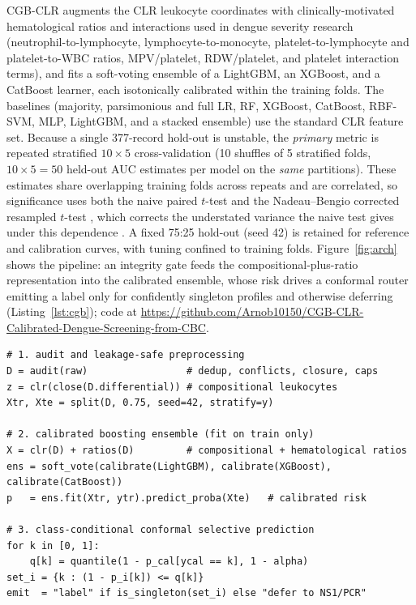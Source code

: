 \documentclass[conference]{IEEEtran}
\begin{document}
CGB-CLR augments the CLR leukocyte coordinates with clinically-motivated
hematological ratios and interactions used in dengue severity research
(neutrophil-to-lymphocyte, lymphocyte-to-monocyte, platelet-to-lymphocyte and
platelet-to-WBC ratios, MPV/platelet, RDW/platelet, and platelet interaction
terms), and fits a soft-voting ensemble of a LightGBM, an XGBoost, and a
CatBoost learner, each isotonically calibrated within the training folds. The
baselines (majority, parsimonious and full LR, RF, XGBoost, CatBoost, RBF-SVM,
MLP, LightGBM, and a stacked ensemble) use the standard CLR feature set.
Because a single 377-record hold-out is unstable, the \emph{primary} metric is
repeated stratified $10\times5$ cross-validation (10 shuffles of 5 stratified
folds, $10\times5=50$ held-out AUC estimates per model on the \emph{same}
partitions). These estimates share overlapping training folds across repeats
and are correlated, so significance uses both the naive paired $t$-test and
the Nadeau--Bengio corrected resampled $t$-test \cite{nadeau2003}, which
corrects the understated variance the naive test gives under this dependence
\cite{dietterich1998}. A fixed 75:25 hold-out (seed 42) is retained for
reference and calibration curves, with tuning confined to training folds.
Figure~\ref{fig:arch} shows the pipeline: an integrity gate feeds the
compositional-plus-ratio representation into the calibrated ensemble, whose
risk drives a conformal router emitting a label only for confidently singleton
profiles and otherwise deferring (Listing~\ref{lst:cgb}); code at
\url{https://github.com/Arnob10150/CGB-CLR-Calibrated-Dengue-Screening-from-CBC}.



\begin{lstlisting}[caption={CGB-CLR training and conformal inference.},label={lst:cgb}]
# 1. audit and leakage-safe preprocessing
D = audit(raw)                 # dedup, conflicts, closure, caps
z = clr(close(D.differential)) # compositional leukocytes
Xtr, Xte = split(D, 0.75, seed=42, stratify=y)

# 2. calibrated boosting ensemble (fit on train only)
X = clr(D) + ratios(D)         # compositional + hematological ratios
ens = soft_vote(calibrate(LightGBM), calibrate(XGBoost), calibrate(CatBoost))
p   = ens.fit(Xtr, ytr).predict_proba(Xte)   # calibrated risk

# 3. class-conditional conformal selective prediction
for k in [0, 1]:
    q[k] = quantile(1 - p_cal[ycal == k], 1 - alpha)
set_i = {k : (1 - p_i[k]) <= q[k]}
emit  = "label" if is_singleton(set_i) else "defer to NS1/PCR"
\end{lstlisting}
\end{document}
